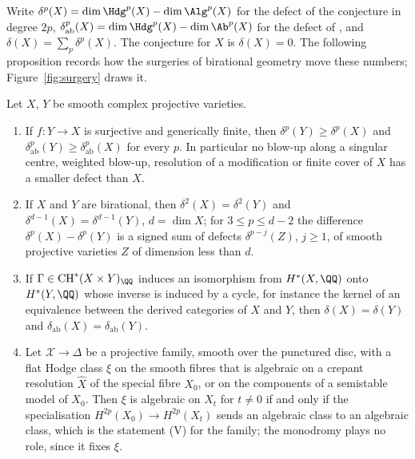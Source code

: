 Write $\delta^{p}(X)=\dim\Hdg^{p}(X)-\dim\Alg^{p}(X)$ for the defect of the conjecture in degree $2p$, $\delta_{\mathrm{ab}}^{p}(X)=\dim\Hdg^{p}(X)-\dim\Ab^{p}(X)$ for the defect of \Fiii{}, and $\delta(X)=\sum_{p}\delta^{p}(X)$. The conjecture for $X$ is $\delta(X)=0$. The following proposition records how the surgeries of birational geometry move these numbers; Figure~\ref{fig:surgery} draws it.

\begin{proposition}\label{prop:surgery}
Let $X$, $Y$ be smooth complex projective varieties.
\begin{enumerate}[label=\textup{(\roman*)},leftmargin=2.4em,itemsep=2pt]
\item If $f\colon Y\to X$ is surjective and generically finite, then $\delta^{p}(Y)\ge\delta^{p}(X)$ and $\delta^{p}_{\mathrm{ab}}(Y)\ge\delta^{p}_{\mathrm{ab}}(X)$ for every $p$. In particular no blow-up along a singular centre, weighted blow-up, resolution of a modification or finite cover of $X$ has a smaller defect than $X$.
\item If $X$ and $Y$ are birational, then $\delta^{2}(X)=\delta^{2}(Y)$ and $\delta^{d-1}(X)=\delta^{d-1}(Y)$, $d=\dim X$; for $3\le p\le d-2$ the difference $\delta^{p}(X)-\delta^{p}(Y)$ is a signed sum of defects $\delta^{p-j}(Z)$, $j\ge1$, of smooth projective varieties $Z$ of dimension less than $d$.
\item If $\Gamma\in\mathrm{CH}^{*}(X\times Y)_{\QQ}$ induces an isomorphism from $H^{*}(X,\QQ)$ onto $H^{*}(Y,\QQ)$ whose inverse is induced by a cycle, for instance the kernel of an equivalence between the derived categories of $X$ and $Y$, then $\delta(X)=\delta(Y)$ and $\delta_{\mathrm{ab}}(X)=\delta_{\mathrm{ab}}(Y)$.
\item Let $\mathcal{X}\to\Delta$ be a projective family, smooth over the punctured disc, with a flat Hodge class $\xi$ on the smooth fibres that is algebraic on a crepant resolution $\hat X$ of the special fibre $X_{0}$, or on the components of a semistable model of $X_{0}$. Then $\xi$ is algebraic on $X_{t}$ for $t\ne0$ if and only if the specialisation $H^{2p}(X_{0})\to H^{2p}(X_{t})$ sends an algebraic class to an algebraic class, which is the statement (V) for the family; the monodromy plays no role, since it fixes $\xi$.
\end{enumerate}
\end{proposition}

